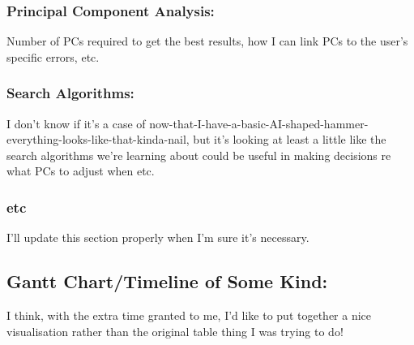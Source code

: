 \documentclass[10pt, oneside, a4paper, draft]{scrartcl}
\begin{document}
\subsubsection*{Principal Component Analysis:}

Number of PCs required to get the best results, how I can link PCs to the user's specific errors, etc. 

\subsubsection*{Search Algorithms:} 

I don't know if it's a case of now-that-I-have-a-basic-AI-shaped-hammer-everything-looks-like-that-kinda-nail, but it's looking at least a little like the search algorithms we're learning about could be useful in making decisions re what PCs to adjust when etc. 

\subsubsection*{etc}

I'll update this section properly when I'm sure it's necessary.

\subsection*{Gantt Chart/Timeline of Some Kind:}

I think, with the extra time granted to me, I'd like to put together a nice visualisation rather than the original table thing I was trying to do! 
\end{document}
